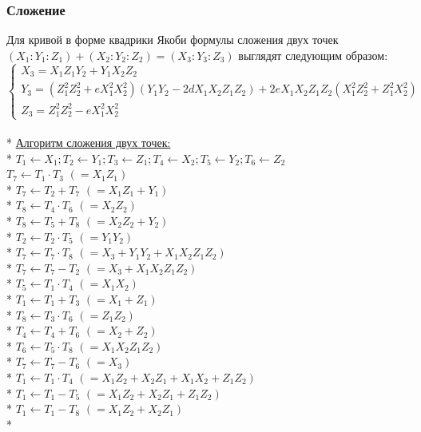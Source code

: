 \documentclass[12pt]{article}
\begin{document}
\subsubsection{Сложение}
Для кривой в форме квадрики Якоби формулы сложения двух точек $(X_1 : Y_1 : Z_1) + (X_2 : Y_2 : Z_2) = (X_3 : Y_3 : Z_3)$ выглядят следующим образом:
\begin{equation*}
\begin{cases}
X_3 = X_1Z_1Y_2 + Y_1X_2Z_2
\\
Y_3 = (Z_1^2Z_2^2 + eX_1^2X_2^2)(Y_1Y_2 - 2dX_1X_2Z_1Z_2) + 2eX_1X_2Z_1Z_2(X_1^2Z_2^2 + Z_1^2X_2^2)
\\
Z_3 = Z_1^2Z_2^2 - eX_1^2X_2^2
\end{cases}
\end{equation*}
\\*
\underline{Алгоритм сложения двух точек:}\\*
$T_1 \leftarrow X_1; T_2 \leftarrow Y_1; T_3 \leftarrow Z_1; T_4 \leftarrow X_2; T_5 \leftarrow Y_2; T_6 \leftarrow Z_2$ \\
$T_7 \leftarrow T_1 \cdot T_3$ \hfill $(= X_1Z_1)$ \\*
$T_7 \leftarrow T_2 + T_7$ \hfill $(= X_1Z_1 + Y_1)$ \\*
$T_8 \leftarrow T_4 \cdot T_6$ \hfill $(= X_2Z_2)$ \\*
$T_8 \leftarrow T_5 + T_8$ \hfill $(= X_2Z_2 + Y_2)$ \\*
$T_2 \leftarrow T_2 \cdot T_5$ \hfill $(= Y_1Y_2)$ \\*
$T_7 \leftarrow T_7 \cdot T_8$ \hfill $(= X_3 + Y_1Y_2 + X_1X_2Z_1Z_2)$ \\*
$T_7 \leftarrow T_7 - T_2$ \hfill $(= X_3 + X_1X_2Z_1Z_2)$ \\*
$T_5 \leftarrow T_1 \cdot T_4$ \hfill $(= X_1X_2)$ \\*
$T_1 \leftarrow T_1 + T_3$ \hfill $(= X_1 + Z_1)$ \\*
$T_8 \leftarrow T_3 \cdot T_6$ \hfill $(= Z_1Z_2)$ \\*
$T_4 \leftarrow T_4 + T_6$ \hfill $(= X_2 + Z_2)$ \\*
$T_6 \leftarrow T_5 \cdot T_8$ \hfill $(= X_1X_2Z_1Z_2)$ \\*
$T_7 \leftarrow T_7 - T_6$ \hfill $(= X_3)$ \\*
$T_1 \leftarrow T_1 \cdot T_4$ \hfill $(= X_1Z_2 + X_2Z_1 + X_1X_2 + Z_1Z_2)$ \\*
$T_1 \leftarrow T_1 - T_5$ \hfill $(= X_1Z_2 + X_2Z_1 + Z_1Z_2)$ \\*
$T_1 \leftarrow T_1 - T_8$ \hfill $(= X_1Z_2 + X_2Z_1)$ \\*
\end{document}
